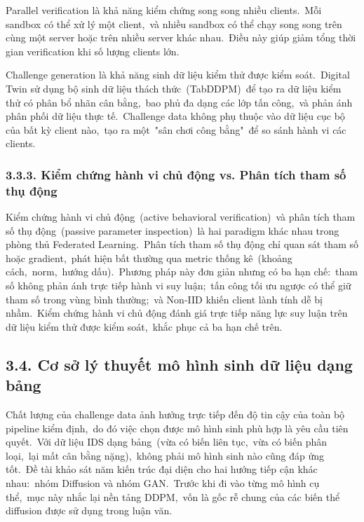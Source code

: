 Parallel verification là khả năng kiểm chứng song song nhiều clients.~Mỗi sandbox có thể xử lý một client,~và nhiều sandbox có thể chạy song song trên cùng một server hoặc trên nhiều server khác nhau.~Điều này giúp giảm tổng thời gian verification khi số lượng clients lớn.

Challenge generation là khả năng sinh dữ liệu kiểm thử được kiểm soát.~Digital Twin sử dụng bộ sinh dữ liệu thách thức~(TabDDPM)~để tạo ra dữ liệu kiểm thử có phân bổ nhãn cân bằng,~bao phủ đa dạng các lớp tấn công,~và phản ánh phân phối dữ liệu thực tế.~Challenge data không phụ thuộc vào dữ liệu cục bộ của bất kỳ client nào,~tạo ra một~"sân chơi công bằng"~để so sánh hành vi các clients.

\subsubsection{3.3.3. Kiểm chứng hành vi chủ động vs. Phân tích tham số thụ động}\label{kiux1ec3m-chux1ee9ng-huxe0nh-vi-chux1ee7-ux111ux1ed9ng-vs.-phuxe2n-tuxedch-tham-sux1ed1-thux1ee5-ux111ux1ed9ng}

Kiểm chứng hành vi chủ động~(active behavioral verification)~và phân tích tham số thụ động~(passive parameter inspection)~là hai paradigm khác nhau trong phòng thủ Federated Learning.~Phân tích tham số thụ động chỉ quan sát tham số hoặc gradient,~phát hiện bất thường qua metric thống kê~(khoảng cách,~norm,~hướng dấu).~Phương pháp này đơn giản nhưng có ba hạn chế:~tham số không phản ánh trực tiếp hành vi suy luận;~tấn công tối ưu ngược có thể giữ tham số trong vùng bình thường;~và Non-IID khiến client lành tính dễ bị nhầm.~Kiểm chứng hành vi chủ động đánh giá trực tiếp năng lực suy luận trên dữ liệu kiểm thử được kiểm soát,~khắc phục cả ba hạn chế trên.

\subsection{3.4. Cơ sở lý thuyết mô hình sinh dữ liệu dạng bảng}\label{cux1a1-sux1edf-luxfd-thuyux1ebft-muxf4-huxecnh-sinh-dux1eef-liux1ec7u-dux1ea1ng-bux1ea3ng}

Chất lượng của challenge data ảnh hưởng trực tiếp đến độ tin cậy của toàn bộ pipeline kiểm định,~do đó việc chọn được mô hình sinh phù hợp là yêu cầu tiên quyết.~Với dữ liệu IDS dạng bảng~(vừa có biến liên tục,~vừa có biến phân loại,~lại mất cân bằng nặng),~không phải mô hình sinh nào cũng đáp ứng tốt.~Đề tài khảo sát năm kiến trúc đại diện cho hai hướng tiếp cận khác nhau:~nhóm Diffusion và nhóm GAN.~Trước khi đi vào từng mô hình cụ thể,~mục này nhắc lại nền tảng DDPM,~vốn là gốc rễ chung của các biến thể diffusion được sử dụng trong luận văn.

